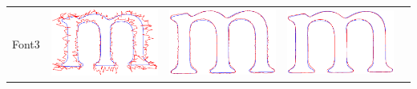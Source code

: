 \documentclass[12pt]{article}
\begin{document}
\begin{center}
\begin{table}[h]
\begin{tabular}{|c|c|c|c|c|}
Font3 & 
\includegraphics[scale = 0.2]{images/f3var10} &
\includegraphics[scale = 0.2]{images/f3var1} &
\includegraphics[scale = 0.2]{images/f3var0_1} &

\end{tabular}
\end{table}
\end{center}
\end{document}
